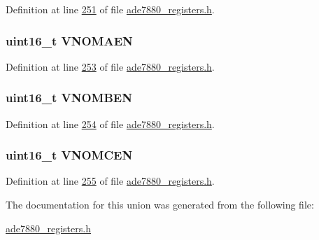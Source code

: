 Definition at line \hyperlink{a00036_source_l00251}{251} of file \hyperlink{a00036_source}{ade7880\-\_\-registers.\-h}.

\hypertarget{a00021_ad345cee8b6a6c1c0d928ba456681dbf2}{
\subsubsection[{V\-N\-O\-M\-A\-E\-N}]{\setlength{\rightskip}{0pt plus 5cm}uint16\-\_\-t V\-N\-O\-M\-A\-E\-N}}\label{de/d11/a00021_ad345cee8b6a6c1c0d928ba456681dbf2}


Definition at line \hyperlink{a00036_source_l00253}{253} of file \hyperlink{a00036_source}{ade7880\-\_\-registers.\-h}.

\hypertarget{a00021_aecd6c7afe1755d7eeb19009fd79ae48e}{
\subsubsection[{V\-N\-O\-M\-B\-E\-N}]{\setlength{\rightskip}{0pt plus 5cm}uint16\-\_\-t V\-N\-O\-M\-B\-E\-N}}\label{de/d11/a00021_aecd6c7afe1755d7eeb19009fd79ae48e}


Definition at line \hyperlink{a00036_source_l00254}{254} of file \hyperlink{a00036_source}{ade7880\-\_\-registers.\-h}.

\hypertarget{a00021_a20177bdcd0f50acba5d42927ac28e5f1}{
\subsubsection[{V\-N\-O\-M\-C\-E\-N}]{\setlength{\rightskip}{0pt plus 5cm}uint16\-\_\-t V\-N\-O\-M\-C\-E\-N}}\label{de/d11/a00021_a20177bdcd0f50acba5d42927ac28e5f1}


Definition at line \hyperlink{a00036_source_l00255}{255} of file \hyperlink{a00036_source}{ade7880\-\_\-registers.\-h}.



The documentation for this union was generated from the following file\-:\begin{DoxyCompactItemize}
\item 
\hyperlink{a00036}{ade7880\-\_\-registers.\-h}\end{DoxyCompactItemize}
